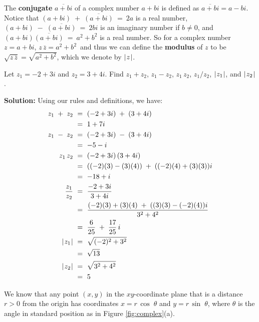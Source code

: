 The \textbf{conjugate} $\overline{a+bi}$ of a complex number $a+bi$ is defined as
$\overline{a+bi} = a-bi$. Notice that $(a+bi) \;+\; \overline{(a+bi)} ~=~ 2a$ is a real number,
$(a+bi) \;-\; \overline{(a+bi)} ~=~ 2bi$ is an imaginary number if $b \ne 0$, and
$(a+bi) \overline{(a+bi)} ~=~ a^2 + b^2$ is a real number. So for a complex number $z=a+bi$,
$z\,\overline{z} = a^2 + b^2 \,$ and thus we can define the \textbf{modulus} of $z$
to be $\sqrt{z\,\overline{z}} = \sqrt{a^2 + b^2}$, which we denote by $\lvert\mspace{1mu}z\mspace{1mu}\rvert$.

\begin{exmp}
 Let $z_1 = -2+3i$ and $z_2 = 3+4i$. Find $z_1 + z_2$, $z_1 - z_2$, $z_1 \, z_2$, $z_1 / z_2$,
 $\lvert\mspace{1mu}z_1\mspace{1mu}\rvert$, and $\lvert\mspace{1mu}z_2\mspace{1mu}\rvert$.\vspace{1mm}
 \par\noindent\textbf{Solution:} Using our rules and definitions, we have:
 \begin{align*}
  z_1 \;+\; z_2 ~&=~ (-2+3i) \;+\; (3+4i)\\
  &=~ 1 + 7i\\
  z_1 \;-\; z_2 ~&=~ (-2+3i) \;-\; (3+4i)\\
  &=~ -5 - i\\
  z_1 \, z_2 ~&=~ (-2+3i)\, (3+4i)\\
  &=~ ((-2)(3) - (3)(4)) \;+\; ((-2)(4) + (3)(3))i\\
  &=~ -18 + i\\
  \dfrac{z_1}{z_2} ~&=~ \dfrac{-2+3i}{3+4i}\\
  &=~ \dfrac{(-2)(3) + (3)(4) \;+\; ((3)(3) - (-2)(4))i}{3^2 + 4^2}\\
  &=~ \dfrac{6}{25} \;+\; \dfrac{17}{25}\,i\\
  \lvert\mspace{1mu}z_1\mspace{1mu}\rvert ~&=~ \sqrt{(-2)^2 + 3^2}\\
  &=~ \sqrt{13}\\
  \lvert\mspace{1mu}z_2\mspace{1mu}\rvert ~&=~ \sqrt{3^2 + 4^2}\\
  &=~ 5
 \end{align*}
\end{exmp}
\divider
\newpage
We know that any point $(x,y)$ in the $xy$-coordinate plane that is a distance $r >0$ from the
origin has coordinates $x=r\,\cos\;\theta$ and $y=r\,\sin\;\theta$, where $\theta$ is the angle in
standard position as in Figure \ref{fig:complex}(a).

